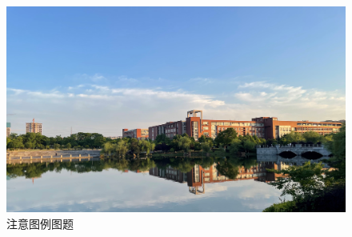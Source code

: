\xiaosi 

\lipsum[1]

\begin{figure}[H]
    \centering
    \includegraphics[width=0.8\linewidth]{img/fig1.jpg}
    \caption{注意图例图题}
    \label{fig:figure2}
\end{figure}

\lipsum[1-2]